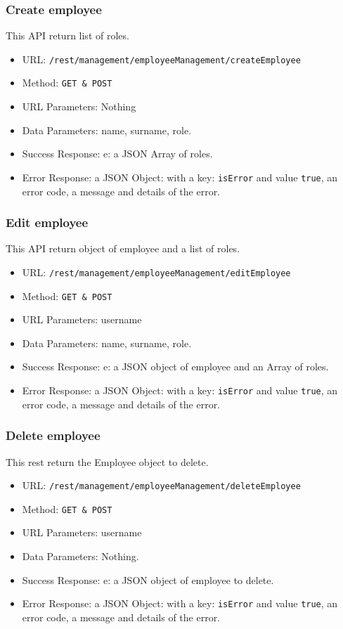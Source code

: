 \subsubsection*{Create employee}
This API return list of roles.

\begin{itemize}
    \item URL: \texttt{/rest/management/employeeManagement/createEmployee}
    \item Method: \texttt{{GET \& POST}}
    \item URL Parameters: Nothing
    \item Data Parameters: name, surname, role.
    \item Success Response: e: a JSON Array of roles.
    \item Error Response: a JSON Object: with a key: \texttt{isError}  and value \texttt{true}, an error code, a message and details of the error.
\end{itemize}

\subsubsection*{Edit employee}
This API return object of employee and a list of roles.
\begin{itemize}
    \item URL: \texttt{/rest/management/employeeManagement/editEmployee}
    \item Method: \texttt{{GET \& POST}}
    \item URL Parameters: username
    \item Data Parameters: name, surname, role.
    \item Success Response: e: a JSON object of employee and an Array of roles.
    \item Error Response: a JSON Object: with a key: \texttt{isError}  and value \texttt{true}, an error code, a message and details of the error.
\end{itemize}

\subsubsection*{Delete employee}
This rest return the Employee object to delete.
\begin{itemize}
    \item URL: \texttt{/rest/management/employeeManagement/deleteEmployee}
    \item Method: \texttt{{GET \& POST}}
    \item URL Parameters: username
    \item Data Parameters: Nothing.
    \item Success Response: e: a JSON object of employee to delete.
    \item Error Response: a JSON Object: with a key: \texttt{isError}  and value \texttt{true}, an error code, a message and details of the error.
\end{itemize}
